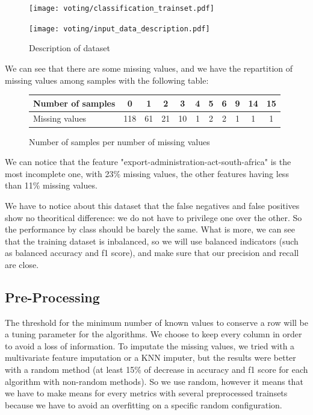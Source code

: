 \documentclass[11pt]{article}
\begin{document}
\begin{figure}
\begin{minipage}[t]{0.3\textwidth}
\texttt{[image: voting/classification\_trainset.pdf]}
\end{minipage}
\begin{minipage}[t]{0.7\textwidth}
\texttt{[image: voting/input\_data\_description.pdf]}
\end{minipage}
   \caption{Description of dataset}
\label{votingfig_fig0}
\end{figure}

We can see that there are some missing values, and we have the repartition of missing values among samples with the following table:
\begin{figure}[h]
\centering
  \begin{tabular}{ | p{5cm} | c | c | c | c | c | c | c | c | c | c |}
    \hline
    Number of samples & 0 & 1 & 2 & 3 & 4 & 5 & 6 & 9 & 14 & 15 \\ \hline
    Missing values & 118 & 61 & 21 & 10 & 1 & 2 & 2 & 1 & 1 & 1 \\
    \hline
    \end{tabular}
    \caption{Number of samples per number of missing values}
    \label{tab_voting0}
  \end{figure}

We can notice that the feature "export-administration-act-south-africa" is the most incomplete one, with 23\% missing values, the other features having less than 11\% missing values.

We have to notice about this dataset that the false negatives and false positives show no theoritical difference: we do not have to privilege one over the other. So the performance by class should be barely the same. What is more, we can see that the training dataset is inbalanced, so we will use balanced indicators (such as balanced accuracy and f1 score), and make sure that our precision and recall are close.

\subsection{Pre-Processing}

The threshold for the minimum number of known values to conserve a row will be a tuning parameter for the algorithms. We choose to keep every column in order to avoid a loss of information.
To imputate the missing values, we tried with a multivariate feature imputation or a KNN imputer, but the results were better with a random method (at least 15\% of decrease in accuracy and f1 score for each algorithm with non-random methods). So we use random, however it means that we have to make means for every metrics with several preprocessed trainsets because we have to avoid an overfitting on a specific random configuration.
\end{document}
